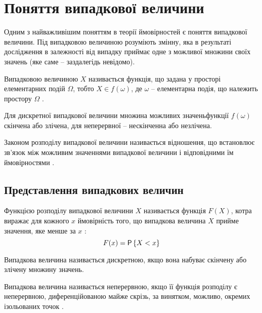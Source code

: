 
\section{Поняття випадкової величини}
Одним з найважливішим поняттям в теорії ймовірностей є поняття випадкової величини. Під випадковою величиною розуміють змінну, яка в результаті дослідження в залежності від випадку приймає одне з можливої множини своїх значень (яке саме – заздалегідь невідомо).

\begin{defin}
	Випадковою величиною $X$ називається функція, що задана у просторі елементарних подій $\Omega$, тобто $X \in f(\omega)$, де $\omega$ – елементарна подія, що належить простору $\Omega$ \cite{Kremer}.
\end{defin}

Для дискретної випадкової величини множина можливих значеньфункції $f(\omega)$ скінчена або злічена, для неперервної – нескінченна або незлічена.

\begin{defin}
	Законом розподілу випадкової величини називається відношення, що встановлює зв'язок між можливим значеннями випадкової величини і відповідними їм ймовірностями \cite{Kremer}.
\end{defin}

\subsection{Представлення випадкових величин}
\begin{defin}
	Функцією розподілу випадкової величини $X$ називається функція $F(X)$, котра виражає для кожного $x$ ймовірність того, що випадкова величина $X$ прийме значення, яке менше за $x$ \cite{Kremer}:
	\begin{equation}
		F(x)=\mathsf{P}\left\{X < x\right\}
	\end{equation}
\end{defin}

\begin{defin}
	Випадкова величина називається дискретною, якщо вона набуває скінчену або злічену множину значень.
\end{defin}

\begin{defin}
	Випадкова величина називається неперервною, якщо її функція розподілу є неперервною, диференційованою майже скрізь, за винятком, можливо, окремих ізольованих точок \cite{Kremer}.
\end{defin}


